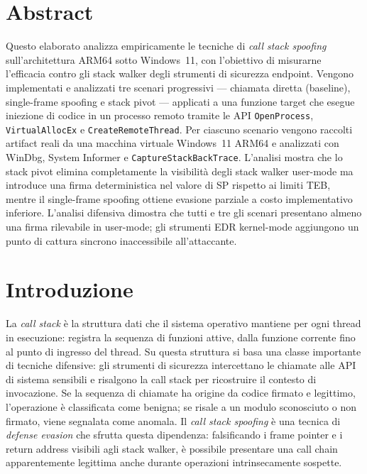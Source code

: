 \chapter*{Abstract}

Questo elaborato analizza empiricamente le tecniche di \emph{call stack spoofing}
sull'architettura ARM64 sotto Windows~11, con l'obiettivo di misurarne l'efficacia
contro gli stack walker degli strumenti di sicurezza endpoint. Vengono implementati
e analizzati tre scenari progressivi --- chiamata diretta (baseline), single-frame
spoofing e stack pivot --- applicati a una funzione target che esegue iniezione di
codice in un processo remoto tramite le API \texttt{OpenProcess},
\texttt{VirtualAllocEx} e \texttt{CreateRemoteThread}. Per ciascuno scenario
vengono raccolti artifact reali da una macchina virtuale Windows~11 ARM64 e
analizzati con WinDbg, System Informer e \texttt{CaptureStackBackTrace}.
L'analisi mostra che lo stack pivot elimina completamente la visibilità degli
stack walker user-mode ma introduce una firma deterministica nel valore di SP
rispetto ai limiti TEB, mentre il single-frame spoofing ottiene evasione parziale
a costo implementativo inferiore. L'analisi difensiva dimostra che tutti e tre
gli scenari presentano almeno una firma rilevabile in user-mode; gli strumenti
EDR kernel-mode aggiungono un punto di cattura sincrono inaccessibile
all'attaccante.


\chapter{Introduzione}
\label{ch:introduzione}

La \emph{call stack} è la struttura dati che il sistema operativo mantiene per
ogni thread in esecuzione: registra la sequenza di funzioni attive, dalla
funzione corrente fino al punto di ingresso del thread. Su questa struttura si
basa una classe importante di tecniche difensive: gli strumenti di sicurezza
intercettano le chiamate alle API di sistema sensibili e risalgono la call stack
per ricostruire il contesto di invocazione. Se la sequenza di chiamate ha
origine da codice firmato e legittimo, l'operazione è classificata come benigna;
se risale a un modulo sconosciuto o non firmato, viene segnalata come anomala.
Il \emph{call stack spoofing} è una tecnica di \emph{defense evasion} che
sfrutta questa dipendenza: falsificando i frame pointer e i return address
visibili agli stack walker, è possibile presentare una call chain apparentemente
legittima anche durante operazioni intrinsecamente sospette.

